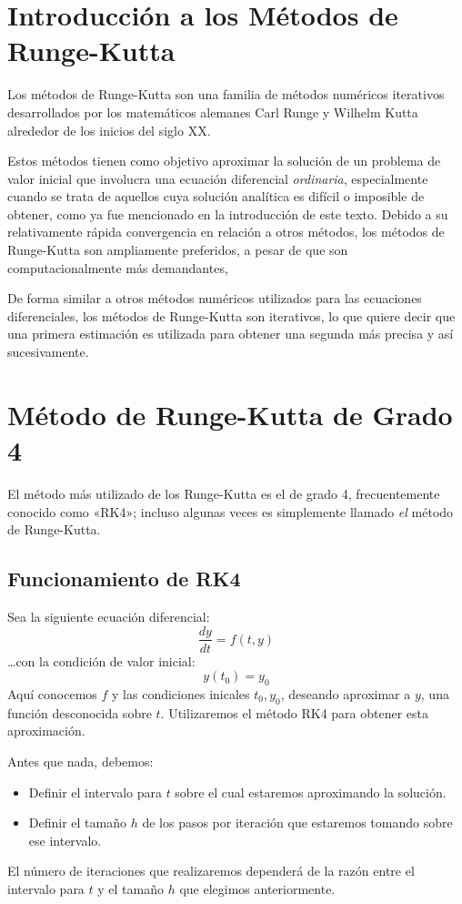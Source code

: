 \documentclass[12pt, a4paper]{article}
\begin{document}
\section{Introducción a los Métodos de Runge-Kutta}

Los métodos de Runge-Kutta son una familia de métodos numéricos iterativos desarrollados por los matemáticos alemanes Carl Runge y Wilhelm Kutta alrededor de los inicios del siglo XX.\@

Estos métodos tienen como objetivo aproximar la solución de un problema de valor inicial que involucra una ecuación diferencial \textit{ordinaria}, especialmente cuando se trata de aquellos cuya solución analítica es difícil o imposible de obtener, como ya fue mencionado en la introducción de este texto. Debido a su relativamente rápida convergencia en relación a otros métodos, los métodos de Runge-Kutta son ampliamente preferidos, a pesar de que son computacionalmente más demandantes,

De forma similar a otros métodos numéricos utilizados para las ecuaciones diferenciales, los métodos de Runge-Kutta son iterativos, lo que quiere decir que una primera estimación es utilizada para obtener una segunda más precisa y así sucesivamente.

\section{Método de Runge-Kutta de Grado 4}

El método más utilizado de los Runge-Kutta es el de grado 4, frecuentemente conocido como «RK4»; incluso algunas veces es simplemente llamado \textit{el} método de Runge-Kutta.

\subsection{Funcionamiento de RK4}

Sea la siguiente ecuación diferencial:
\[
	\frac{dy}{dt} = f(t,y)
\]
…con la condición de valor inicial:
\[
	y(t_0) = y_0
\]
Aquí conocemos \(f\) y las condiciones inicales \(t_0, y_0\), deseando aproximar a \(y\), una función desconocida sobre \(t\). Utilizaremos el método RK4 para obtener esta aproximación.

Antes que nada, debemos:
\begin{itemize}
	\item Definir el intervalo para \(t\) sobre el cual estaremos aproximando la solución.
	\item Definir el tamaño \(h\) de los pasos por iteración que estaremos tomando sobre ese intervalo.
\end{itemize}
El número de iteraciones que realizaremos dependerá de la razón entre el intervalo para \(t\) y el tamaño \(h\) que elegimos anteriormente.
\end{document}
